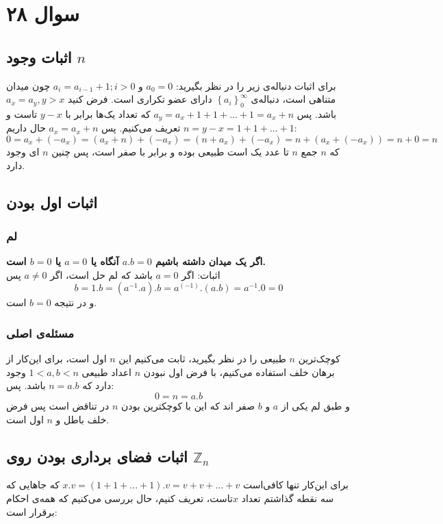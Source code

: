 \documentclass[12pt,a4paper]{article}
\begin{document}
\section{سوال ۲۸}
\subsection{اثبات وجود $n$}
برای اثبات دنباله‌ی زیر را در نظر بگیرید:
$a_0 = 0$
و 
$a_i = a_{i-1} + 1 ; i > 0$
چون میدان متناهی است، دنباله‌ی 
$\left\lbrace a_i \right\rbrace _0^\infty$
دارای عضو تکراری است. فرض کنید 
$a_x = a_y , y > x$
باشد. پس
$a_y = a_x + 1 + 1 + ... + 1 = a_x + n$
که تعداد یک‌ها برابر با
$y-x$
تاست و 
$n = y-x = 1 + 1 + ... + 1$
تعریف می‌کنیم.
پس
$a_x = a_x + n$
حال داریم:
\[
0 = a_x + (-a_x) = (a_x + n) + (-a_x) = (n + a_x) + (-a_x) = n + (a_x + (-a_x)) = n + 0 = n
\]
که $n$ جمع $n$ تا عدد یک است طبیعی بوده و برابر با صفر است، پس چنین $n$ ای وجود دارد.
\subsection{اثبات اول بودن}
\subsubsection{لم }
\textbf{اگر یک میدان داشته باشیم 
$a.b = 0$
آنگاه یا 
$a = 0$
یا
$b = 0$
است.}
\\
اثبات: اگر 
$a=0$
باشد که لم حل است، اگر 
$a \neq 0$
پس 
\[
b = 1.b = (a^{-1}.a).b = a^(-1).(a.b) = a^{-1}.0 = 0
\]
و در نتیجه
$b = 0$
است.
\subsubsection{مسئله‌ی اصلی}
کوچک‌ترین $n$ طبیعی را در نظر بگیرید، ثابت می‌کنیم این $n$ اول است، برای این‌کار از برهان خلف استفاده می‌کنیم، با فرض اول نبودن $n$ اعداد طبیعی 
$1 < a, b < n$
وجود دارد که $n = a.b$ باشد. پس:
\[
0 = n = a.b
\]
و طبق لم یکی از $a$ و $b$ صفر اند که این با کوچکترین بودن $n$ در تناقض است پس فرض خلف باطل و $n$ اول است.
\subsection{اثبات فضای برداری بودن روی $\mathbb{Z}_n$}
برای این‌کار تنها کافی‌است 
$x.v = (1+1+...+1).v = v + v + ...+ v$
که جاهایی که سه نقطه گذاشتم تعداد $x$تاست، تعریف کنیم، حال بررسی می‌کنیم که همه‌ی احکام برقرار است:
\end{document}
